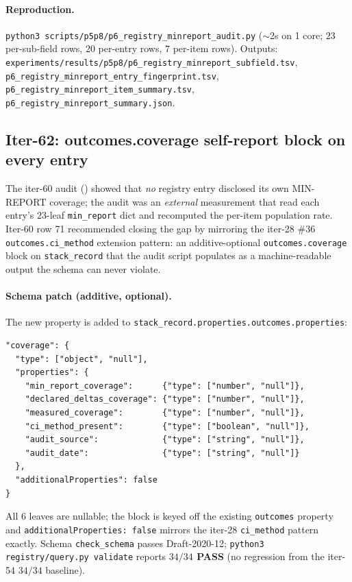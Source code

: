 \paragraph{Reproduction.}
\texttt{python3 scripts/p5p8/p6\_registry\_minreport\_audit.py}
($\sim$2s on 1 core; $23$ per-sub-field rows, $20$ per-entry rows,
$7$ per-item rows). Outputs:
\texttt{experiments/results/p5p8/p6\_registry\_minreport\_subfield.tsv},
\texttt{p6\_registry\_minreport\_entry\_fingerprint.tsv},
\texttt{p6\_registry\_minreport\_item\_summary.tsv},
\texttt{p6\_registry\_minreport\_summary.json}.

\subsection{Iter-62: outcomes.coverage self-report block on every entry}
\label{sec:p6-outcomes-coverage-block}

The iter-60 audit () showed that
\emph{no} registry entry disclosed its own MIN-REPORT coverage; the
audit was an \emph{external} measurement that read each entry's
$23$-leaf \texttt{min\_report} dict and recomputed the per-item
population rate. Iter-60 row 71 recommended closing the gap by
mirroring the iter-28 \#36 \texttt{outcomes.ci\_method} extension
pattern: an additive-optional \texttt{outcomes.coverage} block on
\texttt{stack\_record} that the audit script populates as a
machine-readable output the schema can never violate.

\paragraph{Schema patch (additive, optional).}
The new property is added to \texttt{stack\_record.properties.outcomes.properties}:
\begin{verbatim}
"coverage": {
  "type": ["object", "null"],
  "properties": {
    "min_report_coverage":      {"type": ["number", "null"]},
    "declared_deltas_coverage": {"type": ["number", "null"]},
    "measured_coverage":        {"type": ["number", "null"]},
    "ci_method_present":        {"type": ["boolean", "null"]},
    "audit_source":             {"type": ["string", "null"]},
    "audit_date":               {"type": ["string", "null"]}
  },
  "additionalProperties": false
}
\end{verbatim}
All $6$ leaves are nullable; the block is keyed off the existing
\texttt{outcomes} property and \texttt{additionalProperties: false}
mirrors the iter-28 \texttt{ci\_method} pattern exactly. Schema
\texttt{check\_schema} passes Draft-2020-12; \texttt{python3
registry/query.py validate} reports \textbf{$34/34$ PASS} (no
regression from the iter-54 $34/34$ baseline).

